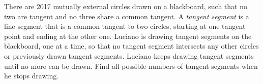 There are 2017 mutually external circles drawn on a blackboard, such that no two are tangent and no three share a common tangent. A \emph{tangent segment} is a line segment that is a common tangent to two circles, starting at one tangent point and ending at the other one. Luciano is drawing tangent segments on the blackboard, one at a time, so that no tangent segment intersects any other circles or previously drawn tangent segments. Luciano keeps drawing tangent segments until no more can be drawn. Find all possible numbers of tangent segments when he stops drawing.
